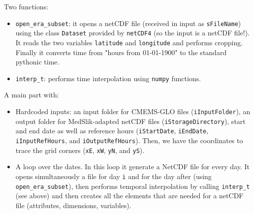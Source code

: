 Two functions:

\begin{itemize}
\item \texttt{open\_era\_subset}: it opens a netCDF file (received in input as \texttt{sFileName}) using the class \texttt{Dataset} provided by \texttt{netCDF4} (so the input is a netCDF file!). It reads the two variables \texttt{latitude} and \texttt{longitude} and performs cropping. Finally it converts time from "hours from 01-01-1900" to the standard pythonic time.

\item \texttt{interp\_t}: performs time interpolation using \texttt{numpy} functions.
\end{itemize}

A main part with:

\begin{itemize}
\item Hardcoded inputs: an input folder for CMEMS-GLO files (\texttt{iInputFolder}), an output folder for MedSlik-adapted netCDF files (\texttt{iStorageDirectory}), start and end date as well as reference hours (\texttt{iStartDate}, \texttt{iEndDate}, \texttt{iInputRefHours}, and \texttt{iOutputRefHours}). Then, we have the coordinates to trace the grid corners (\texttt{xE}, \texttt{xW}, \texttt{yN}, and \texttt{yS}).

\item A loop over the dates. In this loop it generate a NetCDF file for every day. It opens simultaneously a file for day \texttt{i} and for the day after (using \texttt{open\_era\_subset}), then performs temporal interpolation by calling \texttt{interp\_t} (see above) and then creates all the elements that are needed for a netCDF file (attributes, dimensions, variables).

\end{itemize}
